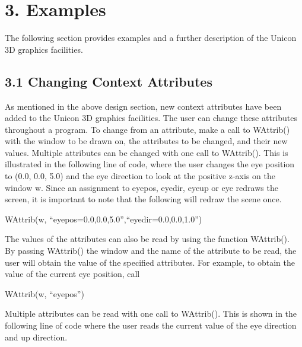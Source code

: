\documentclass[letterpaper]{article}
\begin{document}
\section[3. Examples]{3. Examples}

The following section provides examples and a further description of
the Unicon 3D graphics facilities.

\subsection[3.1 Changing Context Attributes]{3.1 Changing Context Attributes}

{
As mentioned in the above design section, new context attributes have been added to the Unicon 3D graphics facilities.
The user can change these attributes throughout a program. To change from an attribute, make a call to
\textsf{WAttrib()} with the window to be drawn on, the attributes to be changed, and their new values. Multiple
attributes can be changed with one call to \textsf{WAttrib()}. This is illustrated in the following line of code, where
the user changes the eye position to \textsf{(0.0, 0.0, 5.0)} and the eye direction to look at the positive z-axis on
the window w. Since an assignment to \textsf{eyepos}, \textsf{eyedir}, \textsf{eyeup} or \textsf{eye} redraws the
screen, it is important to note that the following will redraw the scene once. }


\bigskip

{\sffamily
WAttrib(w, ``eyepos=0.0,0.0,5.0'',``eyedir=0.0,0.0,1.0'')}


\bigskip

{
The values of the attributes can also be read by using the function \textsf{WAttrib()}.\texttt{ }By passing
\textsf{WAttrib()} the window and the name of the attribute to be read, the user will obtain the value of the specified
attributes. For example, to obtain the value of the current eye position, call }


\bigskip

{\sffamily
WAttrib(w, ``eyepos'')}


\bigskip

{
Multiple attributes can be read with one call to \textsf{WAttrib()}. This is shown in the following line of code where
the user reads the current value of the eye direction and up direction. }


\bigskip
\end{document}
